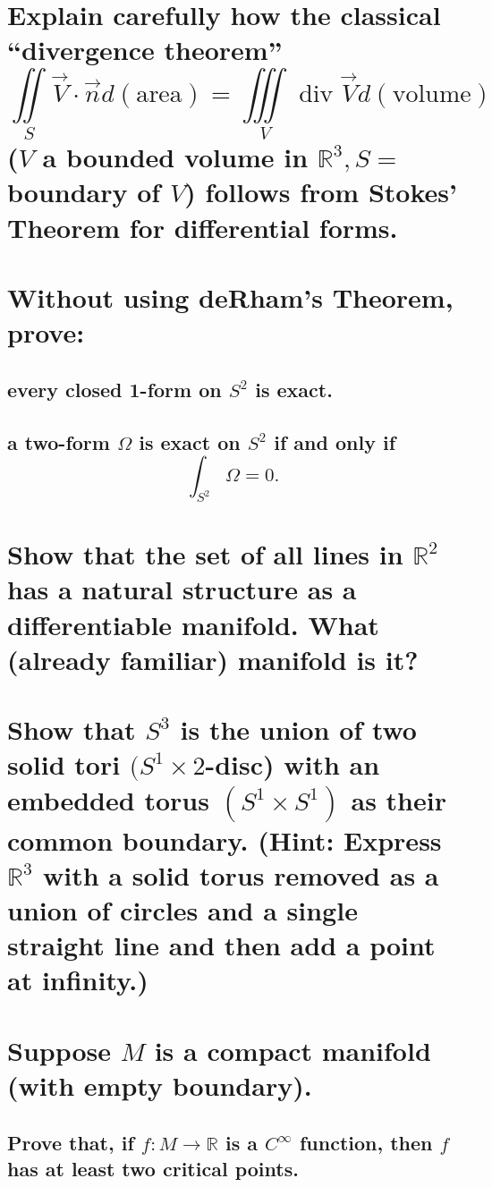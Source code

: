 \documentclass[10pt]{article}
\DeclareMathOperator{\dev}{div}
\newcommand{\hint}[1]{(Hint: #1)}
\begin{document}
 

\section{Explain carefully how the classical ``divergence theorem''
$$\iint\limits_S \vec{V} \cdot \vec{n} d(\mathrm{area}) = \iiint\limits_V \dev \vec{V} d(\mathrm{volume})$$
($V$ a bounded volume in $\mathbb{R} ^3, S= $ boundary of $V$) follows from Stokes' Theorem for
differential forms.}

\section{Without using deRham's Theorem, prove:}

\subsection{every closed 1-form on $S^2$ is exact.}

\subsection{a two-form $\Omega$ is exact on $S^2$ if and only if 
$$\int_{S^2}\Omega=0.$$}

\section{Show that the set of all lines in $\mathbb{R} ^2$ has a natural structure as a
  differentiable manifold. What (already familiar) manifold is it?}

\section{Show that $S^3$ is the union of two solid tori $(S^1 \times 2$-disc) with an embedded torus
  $(S^1 \times S^1)$ as their common boundary. \hint{Express $\mathbb{R} ^3$ with a solid torus
    removed as a union of circles and a single straight line and then add a point at infinity.}}

\section{Suppose $M$ is a compact manifold (with empty boundary).}

\subsection{Prove that, if $f: M \to \mathbb{R}$ is a $C^\infty$ function, then $f$ has at least two
critical points.}
\end{document}
